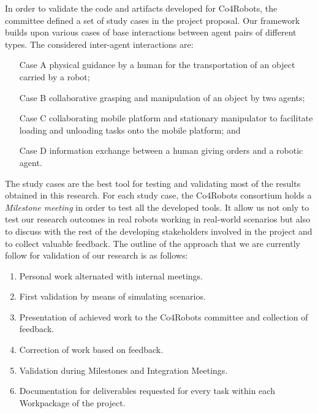 In order to validate the code and artifacts developed for Co4Robots, the committee defined a set of study cases in the project proposal.
Our framework builds upon various cases of base interactions between agent pairs of different types. 
The considered inter-agent interactions are:
\begin{itemize}
\item[Case A] physical guidance by a human for the transportation of an object carried by a robot;
\item[Case B] collaborative grasping and manipulation of an object by two agents;
\item[Case C]collaborating mobile platform and stationary manipulator to facilitate loading and unloading tasks onto the mobile platform; and
\item[Case D] information exchange between a human giving orders and a robotic agent. 
\end{itemize}

The study cases are the best tool for testing and validating most of the results obtained in this research.
For each study case, the Co4Robots consortium holds a \emph{Milestone meeting} in order to test all the developed tools.
It allow us not only to test our research outcomes in real robots working in real-world scenarios but also to discuss with the rest of the developing stakeholders involved in the project and to collect valuable feedback.
The outline of the approach that we are currently follow for validation of our research is as follows:
\begin{enumerate}
\item Personal work alternated with internal meetings.
\item First validation by means of simulating scenarios.
\item Presentation of achieved work to the Co4Robots committee and collection of feedback.
\item Correction of work based on feedback.
\item Validation during Milestones and Integration Meetings.
\item Documentation for deliverables requested for every task within each Workpackage of the project.
\end{enumerate}





